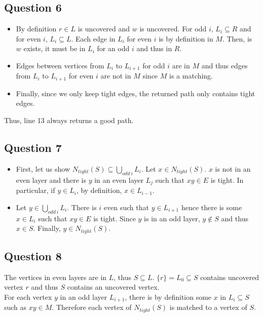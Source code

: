 \documentclass{cours}
\begin{document}
\subsection{Question 6}
\begin{itemize}
    \item By definition $r \in L$ is uncovered and $w$ is uncovered. For odd $i$, $L_{i} \subseteq R$ and for even $i$, $L_{i} \subseteq L$. Each edge in $L_{i}$ for even $i$ is by definition in $M$. Then, is $w$ exists, it must be in $L_{i}$ for an odd $i$ and thus in $R$. 
    \item Edges between vertices from $L_{i}$ to $L_{i + 1}$ for odd $i$ are in $M$ and thus edges from $L_{i}$ to $L_{i + 1}$ for even $i$ are not in $M$ since $M$ is a matching. 
    \item Finally, since we only keep tight edges, the returned path only contains tight edges.
\end{itemize}
Thus, line 13 always returns a good path. 

\subsection{Question 7}
\begin{itemize}
    \item First, let us show $N_{tight}(S) \subseteq \bigcup_{odd\ i} L_{i}$. Let $x \in N_{tight}(S)$. $x$ is not in an even layer and there is $y$ in an even layer $L_{j}$ such that $xy \in E$ is tight. In particular, if $y \in L_{i}$, by definition, $x \in L_{i-1}$. 
    \item Let $y \in \bigcup_{odd\ i} L_{i}$. There is $i$ even such that $y \in L_{i + 1}$ hence there is some $x \in L_{i}$ such that $xy \in E$ is tight. Since $y$ is in an odd layer, $y \notin S$ and thus $x \in S$. Finally, $y \in N_{tight}(S)$.
\end{itemize}

\subsection{Question 8}
The vertices in even layers are in $L$, thus $S \subseteq L$. $\{r\} = L_{0} \subseteq S$ contains uncovered vertex $r$ and thus $S$ contains an uncovered vertex. \\
For each vertex $y$ in an odd layer $L_{i + 1}$, there is by definition some $x$ in $L_{i} \subseteq S$ such as $xy \in M$. Therefore each vertex of $N_{tight}(S)$ is matched to a vertex of $S$. 
\end{document}
